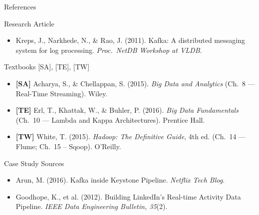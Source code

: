 \documentclass[aspectratio=169,10pt]{beamer}
\begin{document}
\begin{frame}{References}
  \begin{block}{Research Article}
    \begin{itemize}
      \item Kreps, J., Narkhede, N., \& Rao, J. (2011).
            Kafka: A distributed messaging system for log processing.
            \textit{Proc.\ NetDB Workshop at VLDB}.
    \end{itemize}
  \end{block}
  \vspace{4pt}
  \begin{block}{Textbooks \textmd{[SA], [TE], [TW]}}
    \begin{itemize}
      \item \textbf{[SA]} Acharya, S., \& Chellappan, S. (2015).
            \textit{Big Data and Analytics}
            (Ch.~8 — Real-Time Streaming). Wiley.
      \item \textbf{[TE]} Erl, T., Khattak, W., \& Buhler, P. (2016).
            \textit{Big Data Fundamentals}
            (Ch.~10 — Lambda and Kappa Architectures). Prentice Hall.
      \item \textbf{[TW]} White, T. (2015).
            \textit{Hadoop: The Definitive Guide}, 4th ed.
            (Ch.~14 — Flume; Ch.~15 -- Sqoop). O'Reilly.
    \end{itemize}
  \end{block}
  \vspace{4pt}
  \begin{block}{Case Study Sources}
    \begin{itemize}
      \item Arun, M. (2016).
            Kafka inside Keystone Pipeline.
            \textit{Netflix Tech Blog}.
      \item Goodhope, K., et al. (2012).
            Building LinkedIn's Real-time Activity Data Pipeline.
            \textit{IEEE Data Engineering Bulletin, 35}(2).
    \end{itemize}
  \end{block}
\end{frame}
\end{document}
